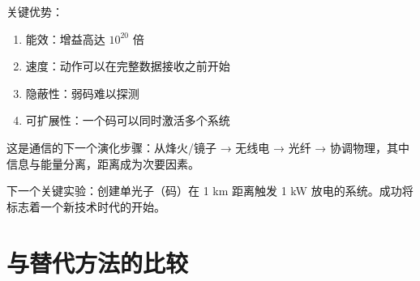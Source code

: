 \documentclass[11pt,a4paper]{article}
\begin{document}
	关键优势：
	\begin{enumerate}
		\item 能效：增益高达 $10^{20}$ 倍
		\item 速度：动作可以在完整数据接收之前开始
		\item 隐蔽性：弱码难以探测
		\item 可扩展性：一个码可以同时激活多个系统
	\end{enumerate}
	
	这是通信的下一个演化步骤：从烽火/镜子 → 无线电 → 光纤 → 协调物理，其中信息与能量分离，距离成为次要因素。
	
	下一个关键实验：创建单光子（码）在 1 km 距离触发 1 kW 放电的系统。成功将标志着一个新技术时代的开始。
	
	\section{与替代方法的比较}
\end{document}
